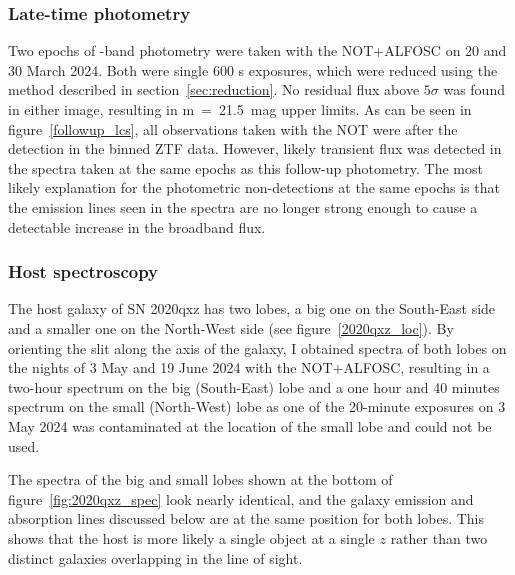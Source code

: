 \documentclass[a4paper,oneside,12pt, class=Latex/Classes/PhDthesisPSnPDF, crop=false]{standalone}
\begin{document}
\subsubsection{Late-time photometry}
Two epochs of \ztfi-band photometry were taken with the NOT+ALFOSC on 20 and 30 March 2024. Both were single 600 s exposures, which were reduced using the method described in section~\ref{sec:reduction}. No residual flux above $5\sigma$ was found in either image, resulting in m~=~21.5~mag upper limits. As can be seen in figure~\ref{followup_lcs}, all observations taken with the NOT were after the detection in the binned ZTF data. However, likely transient flux was detected in the spectra taken at the same epochs as this follow-up photometry. The most likely explanation for the photometric non-detections at the same epochs is that the emission lines seen in the spectra are no longer strong enough to cause a detectable increase in the broadband flux.


\subsubsection{Host spectroscopy}
\label{2020qxz_host_specs}
The host galaxy of SN 2020qxz has two lobes, a big one on the South-East side and a smaller one on the North-West side (see figure~\ref{2020qxz_loc}). By orienting the slit along the axis of the galaxy, I obtained spectra of both lobes on the nights of 3 May and 19 June 2024 with the NOT+ALFOSC, resulting in a two-hour spectrum on the big (South-East) lobe and a one hour and 40 minutes spectrum on the small (North-West) lobe as one of the 20-minute exposures on 3 May 2024 was contaminated at the location of the small lobe and could not be used.

The spectra of the big and small lobes shown at the bottom of figure~\ref{fig:2020qxz_spec} look nearly identical, and the galaxy emission and absorption lines discussed below are at the same position for both lobes. This shows that the host is more likely a single object at a single $z$ rather than two distinct galaxies overlapping in the line of sight.
\end{document}
